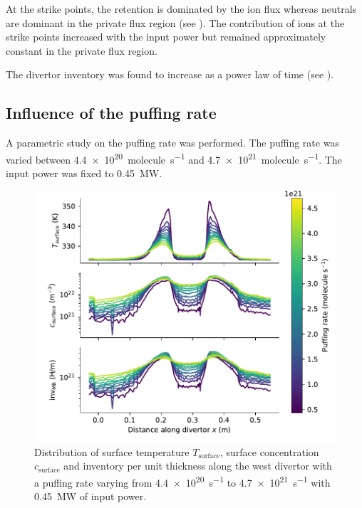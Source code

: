 At the \glspl{strike point}, the \gls{retention} is dominated by the ion flux whereas neutrals are dominant in the \gls{private flux region} (see ).
The contribution of ions at the \glspl{strike point} increased with the input power but remained approximately constant in the \gls{private flux region}.

The \gls{divertor} \gls{inventory} was found to increase as a power law of time (see ).


\subsection{Influence of the puffing rate} 

A parametric study on the puffing rate was performed.
The puffing rate was varied between \SI{4.4e20}{molecule.s^{-1}} and \SI{4.7e21}{molecule.s^{-1}}.
The input power was fixed to \SI{0.45}{MW}.

\begin{figure}[h]
    \centering
    \includegraphics[width=\linewidth]{Figures/Chapter4/WEST/inventory_along_divertor.pdf}
    \caption{Distribution of surface temperature $T_\mathrm{surface}$, surface concentration $c_\mathrm{surface}$ and \gls{inventory} per unit thickness along the \gls{west} \gls{divertor} with a puffing rate varying from \SI{4.4e20}{s^{-1}} to \SI{4.7e21}{s^{-1}} with \SI{0.45}{MW} of input power.}
\end{figure}

